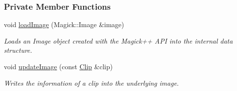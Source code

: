 \subsubsection*{Private Member Functions}
\begin{CompactItemize}
\item 
void \hyperlink{class_recognizer_acc4244738f2577a0c344c3b3af22eb0}{loadImage} (Magick::Image \&image)
\begin{CompactList}\small\item\em Loads an Image object created with the Magick++ API into the internal data structure. \item\end{CompactList}\item 
void \hyperlink{class_recognizer_0779d8bb035f7d51cb26fdc3d410e019}{updateImage} (const \hyperlink{class_clip}{Clip} \&clip)
\begin{CompactList}\small\item\em Writes the information of a clip into the underlying image. \item\end{CompactList}\end{CompactItemize}
